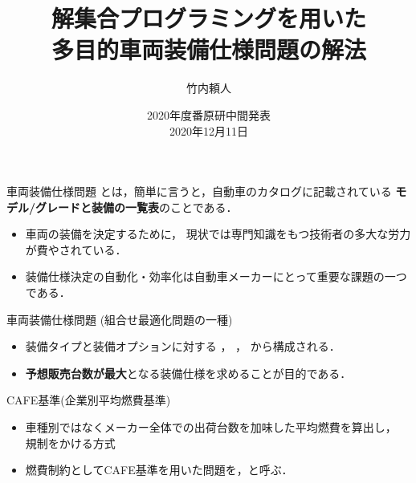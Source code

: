 \documentclass[dvipdfmx, 11pt]{beamer}
\title{解集合プログラミングを用いた\\多目的車両装備仕様問題の解法}
\author{竹内頼人}
\institute{名古屋大学 大学院情報学研究科 番原研究室}
\date{2020年度番原研中間発表\\ 2020年12月11日}
\begin{document}
\frame{\titlepage}
\begin{frame}{車両装備仕様問題}
 とは，簡単に言うと，自動車のカタログに記載されている
 \textbf{モデル/グレードと装備の一覧表}のことである．
 \begin{itemize}
  \item 車両の装備を決定するために，
	現状では専門知識をもつ技術者の多大な労力が費やされている．
  \item 装備仕様決定の自動化・効率化は自動車メーカーにとって重要な課題の一つである．
 \end{itemize}
 \begin{block}{車両装備仕様問題 (組合せ最適化問題の一種)}
  \begin{itemize}
   \item 装備タイプと装備オプションに対する
	 ，
	 ，
	 から構成される．
   \item {\bf 予想販売台数が最大}となる装備仕様を求めることが目的である．
  \end{itemize}
 \end{block}
 \begin{alertblock}{CAFE基準(企業別平均燃費基準)}
  \begin{itemize}
   \item 車種別ではなくメーカー全体での出荷台数を加味した平均燃費を算出し，
	 規制をかける方式
   \item 燃費制約としてCAFE基準を用いた問題を，と呼ぶ．
  \end{itemize}
 \end{alertblock}
\end{frame}
\end{document}
